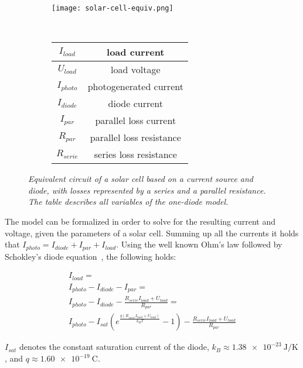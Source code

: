 \begin{figure}[!ht]
\centering
\begin{subfigure}{0.4\textwidth}
  \texttt{[image: solar-cell-equiv.png]}
\end{subfigure}
~
\begin{subfigure}{0.4\textwidth}
  \begin{tabular}[b]{| c | c |}
  \hline
  $I_{load}$ & load current \\ \hline
  $U_{load}$ & load voltage\\ \hline
  $I_{photo}$ & photogenerated current \\ \hline
  $I_{diode}$ & diode current \\ \hline
  $I_{par}$ & parallel loss current \\ \hline
  $R_{par}$ & parallel loss resistance \\ \hline
  $R_{serie}$ & series loss resistance \\ \hline
  \end{tabular}
\end{subfigure}
  \caption[Equivalent circuit of a solar cell]{
    \emph{
    Equivalent circuit of a solar cell based on a current source and diode,
    with losses represented by a series and a parallel resistance.
    The table describes all variables of the one-diode model.
    }
  }
  \label{fig:solar-cell-equiv}
\end{figure}

\clearpage
The model can be formalized in order to solve for the resulting current and voltage, given the parameters of a solar cell.
Summing up all the currents it holds that $I_{photo} = I_{diode} + I_{par} + I_{load}$.
Using the well known Ohm's law followed by Schokley's diode equation~\cite{Walker2001}, the following holds:

\begin{multline}
\label{eq:eq-circuit}
I_{load} = \\
I_{photo} - I_{diode} - I_{par} = \\
I_{photo} - I_{diode} - \frac{R_{serie}I_{load} + U_{load}}{R_{par}} = \\
I_{photo} - I_{sat}(e^\frac{q(R_{serie}I_{load} + U_{load})}{k_B T} - 1) - \frac{R_{serie}I_{load} + U_{load}}{R_{par}}
\end{multline}

$I_{sat}$ denotes the constant saturation current of the diode,
$k_B \approx \SI{1.38e-23}{\joule\per\kelvin}$,
and $q \approx \SI{1.60e-19}{\coulomb}$.


